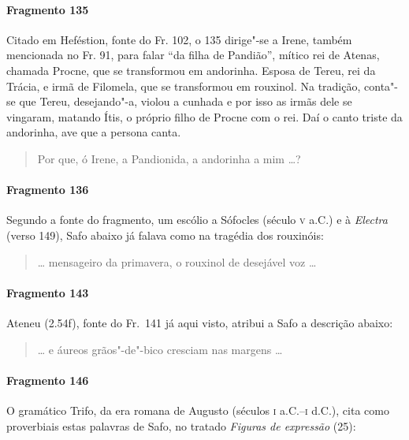 {\paragraph{Fragmento 135}

{\small Citado em Heféstion, fonte do Fr. 102, o 135 dirige"-se a Irene, também mencionada no Fr. 91, para falar ``da filha de Pandião'', mítico rei de Atenas, chamada Procne, que se transformou em andorinha. Esposa de Tereu, rei da Trácia, e irmã de Filomela, que se transformou em rouxinol. Na tradição, conta"-se que Tereu, desejando"-a, violou a cunhada e por isso as irmãs dele se vingaram, matando Ítis, o próprio filho de Procne com o rei. Daí o canto triste da andorinha, ave que a persona canta.}

\begin{verse}
Por que, ó Irene, a Pandionida, a andorinha a mim \ldots{}?
\end{verse}

\paragraph{Fragmento 136}

{\small Segundo a fonte do fragmento, um escólio a Sófocles (século \textsc{v} a.C.) e à
\textit{Electra }(verso 149), Safo abaixo já falava como na tragédia dos
rouxinóis:}

\begin{verse}
\ldots{} mensageiro da primavera, o rouxinol de \qb{}desejável voz \ldots{}
\end{verse}

\paragraph{Fragmento 143}

{\small Ateneu (2.54f), fonte do Fr.~141 já aqui visto, atribui a Safo a descrição abaixo:}

\begin{verse}
\ldots{} e áureos grãos"-de"-bico cresciam nas margens \ldots{}
\end{verse}

\paragraph{Fragmento 146}

{\small O gramático Trifo, da era romana de Augusto (séculos \textsc{i} a.C.--\textsc{i} d.C.), 
cita como proverbiais estas palavras de Safo, no tratado \textit{Figuras de expressão} (25):}

}
